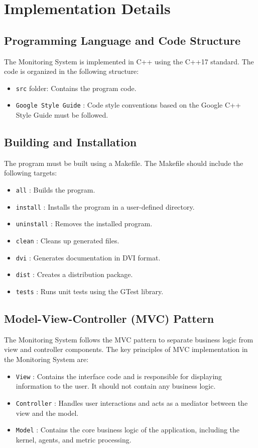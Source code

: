 \documentclass[12pt, a4paper]{article}
\begin{document}
\section{Implementation Details}

\subsection{Programming Language and Code Structure}
The Monitoring System is implemented in C++ using the C++17 standard. The code is organized in the following structure:
\begin{itemize}
    \item \texttt{src} folder: Contains the program code.
    \item \texttt{Google Style Guide} : Code style conventions based on the Google C++ Style Guide must be followed.
\end{itemize}

\subsection{Building and Installation}
The program must be built using a Makefile. The Makefile should include the following targets:
\begin{itemize}
    \item \texttt{all} : Builds the program.
    \item \texttt{install} : Installs the program in a user-defined directory.
    \item \texttt{uninstall} : Removes the installed program.
    \item \texttt{clean} : Cleans up generated files.
    \item \texttt{dvi} : Generates documentation in DVI format.
    \item \texttt{dist} : Creates a distribution package.
    \item \texttt{tests} : Runs unit tests using the GTest library.
\end{itemize}

\subsection{Model-View-Controller (MVC) Pattern}
The Monitoring System follows the MVC pattern to separate business logic from view and controller components. The key principles of MVC implementation in the Monitoring System are:
\begin{itemize}
    \item \texttt{View} : Contains the interface code and is responsible for displaying information to the user. It should not contain any business logic.
    \item \texttt{Controller} : Handles user interactions and acts as a mediator between the view and the model.
    \item \texttt{Model} : Contains the core business logic of the application, including the kernel, agents, and metric processing.
\end{itemize}
\end{document}
